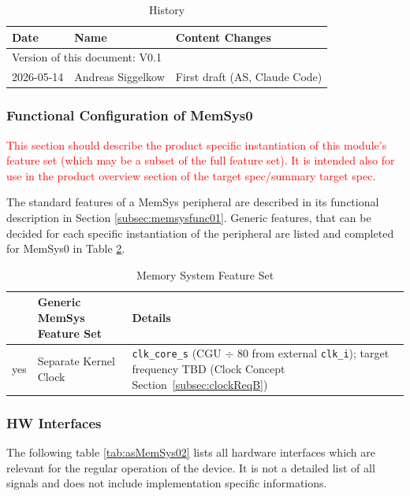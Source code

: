 \begin{table}[H]
\caption{History}
\label{tab:memsyshistory01a}
\centering
\begin{tabularx}{\textwidth}{|X |X |X |}
  \hline
  Date & Name & Content Changes \\
  \hline
  \multicolumn{3}{|l|}{Version of this document: V0.1} \\
  \hline
  2026-05-14 & Andreas Siggelkow & First draft (AS, Claude Code) \\
  \hline
\end{tabularx}
\end{table}

\subsubsection{Functional Configuration of MemSys0}
\textcolor{red}{This section should describe the product specific instantiation of this module’s feature set (which may be a subset of the full feature set). It is intended also for use in the product overview section of the target spec/summary target spec.}

The standard features of a MemSys peripheral are described in its functional description in Section \ref{subsec:memsysfunc01}. Generic features, that can be decided for each specific instantiation of the peripheral are listed and completed for MemSys0 in Table \ref{tab:asMemSys01a}.
\begin{table}[H]
\caption{Memory System Feature Set}
\label{tab:asMemSys01a}
\centering
\begin{tabularx}{\textwidth}{|l |l |X|}
  \hline
   & Generic MemSys Feature Set & Details \\
  \hline
  \hline
  yes & Separate Kernel Clock      & \texttt{clk\_core\_s} (CGU $\div$ 80 from external \texttt{clk\_i});
    target frequency TBD (Clock Concept Section~\ref{subsec:clockReqB}) \\
  \hline
\end{tabularx}
\end{table}

\subsubsection{HW Interfaces}
The following table \ref{tab:asMemSys02} lists all hardware interfaces which are relevant for the regular operation of the device. It is not a detailed list of all signals and does not include implementation specific informations.

